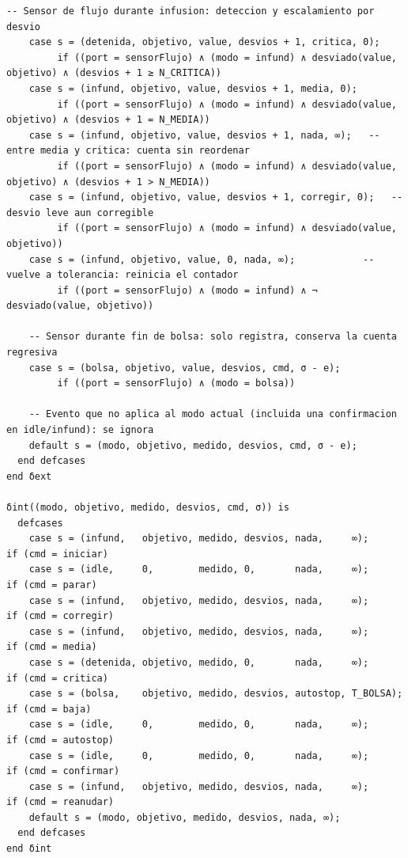 \documentclass[11pt,a4paper]{article}
\begin{document}
\begin{lstlisting}[style=cml]
    -- Sensor de flujo durante infusion: deteccion y escalamiento por desvio
    case s = (detenida, objetivo, value, desvios + 1, critica, 0);
         if ((port = sensorFlujo) ∧ (modo = infund) ∧ desviado(value, objetivo) ∧ (desvios + 1 ≥ N_CRITICA))
    case s = (infund, objetivo, value, desvios + 1, media, 0);
         if ((port = sensorFlujo) ∧ (modo = infund) ∧ desviado(value, objetivo) ∧ (desvios + 1 = N_MEDIA))
    case s = (infund, objetivo, value, desvios + 1, nada, ∞);   -- entre media y critica: cuenta sin reordenar
         if ((port = sensorFlujo) ∧ (modo = infund) ∧ desviado(value, objetivo) ∧ (desvios + 1 > N_MEDIA))
    case s = (infund, objetivo, value, desvios + 1, corregir, 0);   -- desvio leve aun corregible
         if ((port = sensorFlujo) ∧ (modo = infund) ∧ desviado(value, objetivo))
    case s = (infund, objetivo, value, 0, nada, ∞);            -- vuelve a tolerancia: reinicia el contador
         if ((port = sensorFlujo) ∧ (modo = infund) ∧ ¬ desviado(value, objetivo))

    -- Sensor durante fin de bolsa: solo registra, conserva la cuenta regresiva
    case s = (bolsa, objetivo, value, desvios, cmd, σ - e);
         if ((port = sensorFlujo) ∧ (modo = bolsa))

    -- Evento que no aplica al modo actual (incluida una confirmacion en idle/infund): se ignora
    default s = (modo, objetivo, medido, desvios, cmd, σ - e);
  end defcases
end δext

δint((modo, objetivo, medido, desvios, cmd, σ)) is
  defcases
    case s = (infund,   objetivo, medido, desvios, nada,     ∞);        if (cmd = iniciar)
    case s = (idle,     0,        medido, 0,       nada,     ∞);        if (cmd = parar)
    case s = (infund,   objetivo, medido, desvios, nada,     ∞);        if (cmd = corregir)
    case s = (infund,   objetivo, medido, desvios, nada,     ∞);        if (cmd = media)
    case s = (detenida, objetivo, medido, 0,       nada,     ∞);        if (cmd = critica)
    case s = (bolsa,    objetivo, medido, desvios, autostop, T_BOLSA);  if (cmd = baja)
    case s = (idle,     0,        medido, 0,       nada,     ∞);        if (cmd = autostop)
    case s = (idle,     0,        medido, 0,       nada,     ∞);        if (cmd = confirmar)
    case s = (infund,   objetivo, medido, desvios, nada,     ∞);        if (cmd = reanudar)
    default s = (modo, objetivo, medido, desvios, nada, ∞);
  end defcases
end δint


\end{lstlisting}
\end{document}
